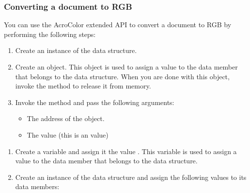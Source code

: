 \documentclass[letterpaper,12pt,english,openany,oneside]{sphinxmanual}
\begin{document}
\subsubsection{Converting a document to RGB}
\label{\detokenize{Plugins_ExtendedAPI:converting-a-document-to-rgb}}
You can use the AcroColor extended API to convert a document to RGB by performing the following steps:
\begin{enumerate}
%
\item {} 
Create an instance of the  data structure.

\item {} 
Create an  object. This object is used to assign a value to the  data member that belongs to the  data structure. When you are done with this object, invoke the  method to release it from memory.

\item {} 
Invoke the  method and pass the following arguments:
\begin{itemize}
\item {} 
The address of the  object.

\item {} 
The value  (this is an  value)

\end{itemize}

\end{enumerate}
\begin{enumerate}
%
\setcounter{enumi}{3}
\item {} 
Create a  variable and assign it the value . This variable is used to assign a value to the  data member that belongs to the  data structure.

\item {} 
Create an instance of the  data structure and assign the following values to its data members:

\end{enumerate}
\end{document}
